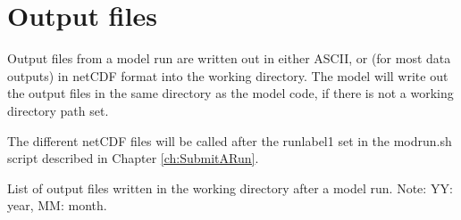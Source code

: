 \chapter{Output files}
\label{ch:output}



Output files from a model run are written out in either ASCII, or
(for most data outputs) in netCDF format into the working directory. 
The model will write out the output files in the same directory as the model 
code, if there is not a working directory path set. 


The different netCDF files will be called after the runlabel1 set in the modrun.sh script 
described in Chapter \ref{ch:SubmitARun}.


\begin{table}
\caption[List of model output files]{List of output files written in the
  working directory after a  model run. 
Note: YY: year, MM: month.}
\vspace{1cm}


\end{table}
